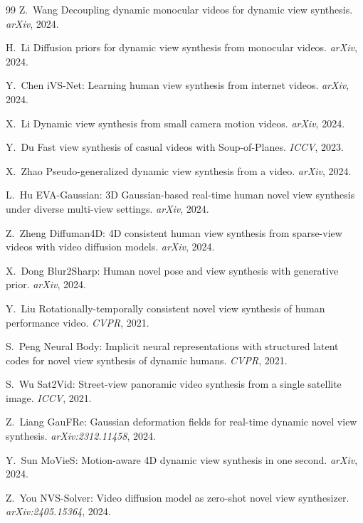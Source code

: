\begin{thebibliography}{99}
Z.~Wang \etal
Decoupling dynamic monocular videos for dynamic view synthesis.
\emph{arXiv}, 2024.


H.~Li \etal
Diffusion priors for dynamic view synthesis from monocular videos.
\emph{arXiv}, 2024.


Y.~Chen \etal
iVS-Net: Learning human view synthesis from internet videos.
\emph{arXiv}, 2024.


X.~Li \etal
Dynamic view synthesis from small camera motion videos.
\emph{arXiv}, 2024.


Y.~Du \etal
Fast view synthesis of casual videos with Soup-of-Planes.
\emph{ICCV}, 2023.


X.~Zhao \etal
Pseudo-generalized dynamic view synthesis from a video.
\emph{arXiv}, 2024.


L.~Hu \etal
EVA-Gaussian: 3D Gaussian-based real-time human novel view synthesis under
diverse multi-view settings.
\emph{arXiv}, 2024.


Z.~Zheng \etal
Diffuman4D: 4D consistent human view synthesis from sparse-view videos with
video diffusion models.
\emph{arXiv}, 2024.


X.~Dong \etal
Blur2Sharp: Human novel pose and view synthesis with generative prior.
\emph{arXiv}, 2024.


Y.~Liu \etal
Rotationally-temporally consistent novel view synthesis of human performance
video.
\emph{CVPR}, 2021.


S.~Peng \etal
Neural Body: Implicit neural representations with structured latent codes for
novel view synthesis of dynamic humans.
\emph{CVPR}, 2021.


S.~Wu \etal
Sat2Vid: Street-view panoramic video synthesis from a single satellite image.
\emph{ICCV}, 2021.


Z.~Liang \etal
GauFRe: Gaussian deformation fields for real-time dynamic novel view synthesis.
\emph{arXiv:2312.11458}, 2024.


Y.~Sun \etal
MoVieS: Motion-aware 4D dynamic view synthesis in one second.
\emph{arXiv}, 2024.


Z.~You \etal
NVS-Solver: Video diffusion model as zero-shot novel view synthesizer.
\emph{arXiv:2405.15364}, 2024.



\end{thebibliography}
